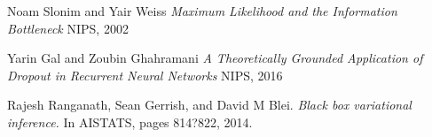 \documentclass[11pt,oneside,openright]{report}
\begin{document}
\begin{thebibliography}{9}
Noam Slonim and Yair Weiss
\textit{Maximum Likelihood and the Information Bottleneck}
NIPS, 2002

Yarin Gal and Zoubin Ghahramani
\textit{A Theoretically Grounded Application of Dropout in Recurrent Neural Networks}
NIPS, 2016

Rajesh Ranganath, Sean Gerrish, and David M Blei.
\textit{Black box variational inference.} 
In AISTATS, pages 814?822, 2014.

\end{thebibliography}
\end{document}
